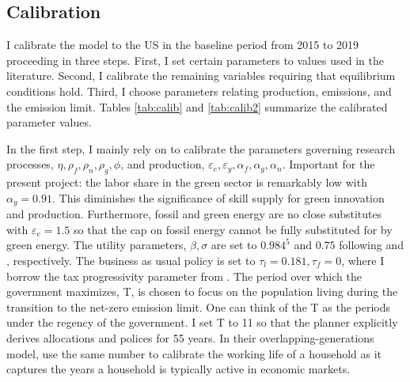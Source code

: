 \subsection{Calibration}\label{subsec:calib}
I calibrate the model to the US in the baseline period from 2015 to 2019 proceeding in three steps. First, I set certain parameters to values used in the literature. Second, I calibrate the remaining variables requiring that equilibrium conditions hold. Third, I choose parameters relating production, emissions, and the emission limit. Tables \ref{tab:calib} and \ref{tab:calib2} summarize the calibrated parameter values.

In the first step, I mainly rely on \cite{Fried2018ClimateAnalysis} to calibrate the parameters governing research processes, $\eta, \rho_f,\rho_n, \rho_g, \phi $, and production, $\varepsilon_e, \varepsilon_y, \alpha_f, \alpha_g, \alpha_n$.  Important for the present project: the labor share in the green sector is remarkably low with $\alpha_g=0.91$. This diminishes the significance of skill supply for green innovation and production. Furthermore, fossil and green energy are no close substitutes with $\varepsilon_e=1.5$ so that the cap on fossil energy cannot be fully substituted for by green energy. The utility parameters, $\beta, \sigma$ are set to $0.984^5$ and $0.75$ following \cite{Barrage2019OptimalPolicy} and \cite{Chetty2011AreMargins}, respectively. The business as usual policy is set to $\tau_l=0.181, \tau_f=0$, where I borrow the tax progressivity parameter from \cite{Heathcote2017OptimalFramework}. 
The period over which the government maximizes, T, is chosen to focus on the population living during the transition to the net-zero emission limit. 
One can think of the T as the periods under the regency of the government. I set T to 11 so that the planner 
explicitly derives  allocations and polices for 55 years. In their overlapping-generations model, \cite{Kotlikoff2021MakingWin} use the same number to calibrate the working life of a household as it captures the years a household is typically active in economic markets. 

